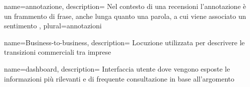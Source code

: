  {
name=annotazione,
description={
Nel contesto di una recensioni l'annotazione è un frammento di frase,
anche lunga quanto una parola, a cui viene associato un sentimento
},
plural=annotazioni
}

 {
name=Business-to-business,
description={
Locuzione utilizzata per descrivere le transizioni commerciali tra imprese
}
}

 {
name=dashboard,
description={
Interfaccia utente dove vengono esposte le informazioni più rilevanti e di
frequente consultazione in base all'argomento
}
}

\makeglossaries

